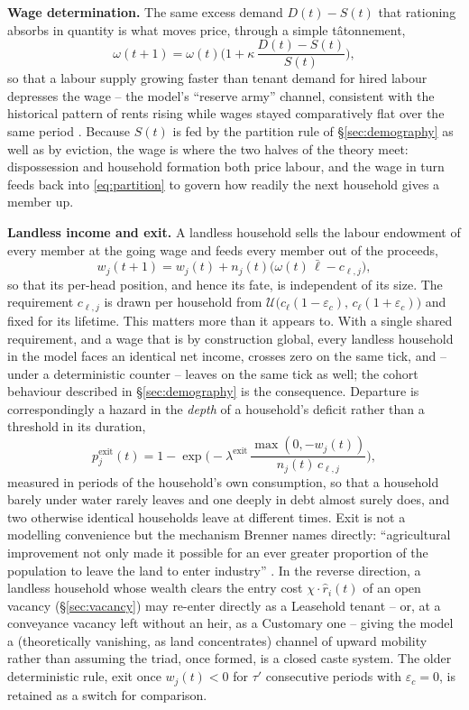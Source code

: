 \documentclass[11pt,english]{article}
\begin{document}
\textbf{Wage determination.} The same excess demand $D(t) - S(t)$ that rationing absorbs in quantity is what moves price, through a simple tâtonnement,
\begin{equation}
\omega(t+1) = \omega(t)\Big(1 + \kappa\,\frac{D(t) - S(t)}{S(t)}\Big),
\end{equation}
so that a labour supply growing faster than tenant demand for hired labour depresses the wage -- the model's ``reserve army'' channel, consistent with the historical pattern of rents rising while wages stayed comparatively flat over the same period \cite{kerridge1953movement,clark2002land}. Because $S(t)$ is fed by the partition rule of \S\ref{sec:demography} as well as by eviction, the wage is where the two halves of the theory meet: dispossession and household formation both price labour, and the wage in turn feeds back into \eqref{eq:partition} to govern how readily the next household gives a member up.

\textbf{Landless income and exit.} A landless household sells the labour endowment of every member at the going wage and feeds every member out of the proceeds,
\begin{equation}
w_j(t+1) = w_j(t) + n_j(t)\big(\omega(t)\,\bar\ell - c_{\ell,j}\big),
\end{equation}
so that its per-head position, and hence its fate, is independent of its size. The requirement $c_{\ell,j}$ is drawn per household from $\mathcal{U}\big(c_\ell(1-\varepsilon_c),\,c_\ell(1+\varepsilon_c)\big)$ and fixed for its lifetime. This matters more than it appears to. With a single shared requirement, and a wage that is by construction global, every landless household in the model faces an identical net income, crosses zero on the same tick, and -- under a deterministic counter -- leaves on the same tick as well; the cohort behaviour described in \S\ref{sec:demography} is the consequence. Departure is correspondingly a hazard in the \emph{depth} of a household's deficit rather than a threshold in its duration,
\begin{equation}
p_j^{\text{exit}}(t) = 1 - \exp\!\Big(\!-\!\lambda^{\text{exit}}\,\frac{\max(0,-w_j(t))}{n_j(t)\,c_{\ell,j}}\Big),
\label{eq:exit}
\end{equation}
measured in periods of the household's own consumption, so that a household barely under water rarely leaves and one deeply in debt almost surely does, and two otherwise identical households leave at different times. Exit is not a modelling convenience but the mechanism Brenner names directly: ``agricultural improvement not only made it possible for an ever greater proportion of the population to leave the land to enter industry'' \cite[p.67]{brenner1976agrarian}. In the reverse direction, a landless household whose wealth clears the entry cost $\chi\cdot\hat r_i(t)$ of an open vacancy (\S\ref{sec:vacancy}) may re-enter directly as a Leasehold tenant -- or, at a conveyance vacancy left without an heir, as a Customary one -- giving the model a (theoretically vanishing, as land concentrates) channel of upward mobility rather than assuming the triad, once formed, is a closed caste system. The older deterministic rule, exit once $w_j(t)<0$ for $\tau'$ consecutive periods with $\varepsilon_c=0$, is retained as a switch for comparison.
\end{document}
